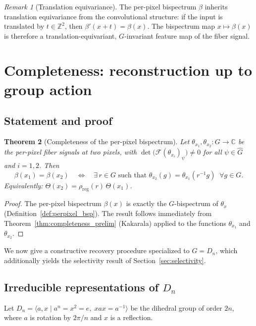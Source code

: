 \documentclass{article}
\newtheorem{theorem}{Theorem}[section]
\theoremstyle{definition}
\theoremstyle{remark}
\newtheorem{remark}[theorem]{Remark}
\newcommand{\FF}{\mathcal{F}}
\newcommand{\C}{\mathbb{C}}
\newcommand{\Z}{\mathbb{Z}}
\newcommand{\Ghat}{\widehat{G}}
\begin{document}
\begin{remark}[Translation equivariance]
The per-pixel bispectrum $\beta$ inherits translation equivariance from the convolutional structure: if the input is translated by $t \in \Z^2$, then $\beta'(x + t) = \beta(x)$. The bispectrum map $x \mapsto \beta(x)$ is therefore a translation-equivariant, $G$-invariant feature map of the fiber signal.
\end{remark}

\section{Completeness: reconstruction up to group action}

\subsection{Statement and proof}

\begin{theorem}[Completeness of the per-pixel bispectrum]\label{thm:completeness}
Let $\theta_{x_1}, \theta_{x_2} : G \to \C$ be the per-pixel fiber signals at two pixels, with $\det\bigl(\FF(\theta_{x_i})_\psi\bigr) \neq 0$ for all $\psi \in \Ghat$ and $i = 1, 2$. Then
\begin{equation}
\beta(x_1) = \beta(x_2)
\quad\Longleftrightarrow\quad
\exists\, r \in G \text{ such that } \theta_{x_2}(g) = \theta_{x_1}(r^{-1}g) \;\;\forall g \in G.
\end{equation}
Equivalently: $\Theta(x_2) = \rho_{\mathrm{reg}}(r)\, \Theta(x_1)$.
\end{theorem}
\begin{proof}
The per-pixel bispectrum $\beta(x)$ is exactly the $G$-bispectrum of $\theta_x$ (Definition~\ref{def:perpixel_bsp}). The result follows immediately from Theorem~\ref{thm:completeness_prelim} (Kakarala) applied to the functions $\theta_{x_1}$ and $\theta_{x_2}$.
\end{proof}

We now give a constructive recovery procedure specialized to $G = D_n$, which additionally yields the selectivity result of Section~\ref{sec:selectivity}.

\subsection{Irreducible representations of $D_n$}\label{sec:dn_irreps}

Let $D_n = \langle a, x \mid a^n = x^2 = e,\; xax = a^{-1} \rangle$ be the dihedral group of order $2n$, where $a$ is rotation by $2\pi/n$ and $x$ is a reflection.
\end{document}
